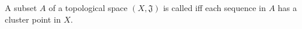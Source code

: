 A subset $A$ of a topological space $(X, \mathfrak{J})$ is called  iff each sequence in $A$ has a cluster point in $X$.
